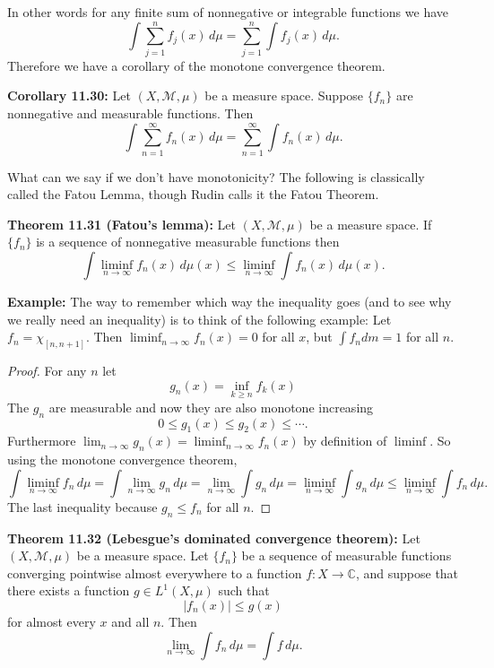 \documentclass[12pt]{book}
\newcommand{\abs}[1]{\left\lvert {#1} \right\rvert}
\newcommand{\C}{{\mathbb{C}}}
\newcommand{\sM}{{\mathcal{M}}}
\theoremstyle{plain}
\theoremstyle{remark}
\theoremstyle{definition}
\theoremstyle{exercise}
\theoremstyle{example}
\begin{document}
In other words for any finite sum of nonnegative or integrable functions we
have
$$
\int \sum_{j=1}^n f_j(x) \, d\mu
=
\sum_{j=1}^n \int f_j(x) \, d\mu .
$$
Therefore we have a corollary of the monotone convergence theorem.

\medskip

\textbf{Corollary 11.30:}
Let $(X,\sM,\mu)$ be a measure space.
Suppose $\{ f_n \}$ are nonnegative and measurable functions.  Then
$$
\int \sum_{n=1}^\infty f_n(x) \, d\mu
=
\sum_{n=1}^\infty \int f_n(x) \, d\mu .
$$

\medskip

What can we say if we don't have monotonicity?  The following is classically
called the Fatou Lemma, though Rudin calls it the Fatou Theorem.

\medskip

\textbf{Theorem 11.31 (Fatou's lemma):}
Let $(X,\sM,\mu)$ be a measure space.
If $\{ f_n \}$ is a sequence of nonnegative measurable functions then
$$
\int \liminf_{n\to\infty} f_n(x) \, d\mu(x) \leq
\liminf_{n\to\infty} \int f_n(x) \, d\mu(x)  .
$$

\medskip

\textbf{Example:}
The way to remember which way the inequality goes (and to see why we really
need an inequality) is to think of the
following example:  Let $f_n = \chi_{[n,n+1]}$.  Then 
$\liminf_{n\to\infty} f_n(x) = 0$ for all $x$, but 
$\int f_n dm = 1$ for all $n$.

\medskip

\begin{proof}
For any $n$ let
$$
g_n(x) = \inf_{k \geq n} f_k(x)
$$
The $g_n$ are measurable and now they are also monotone increasing
$$
0 \leq g_1(x) \leq g_2(x) \leq \cdots .
$$
Furthermore $\lim_{n\to\infty} g_n(x) = \liminf_{n\to\infty} f_n(x)$ by
definition of $\liminf$.  So using the monotone convergence theorem,
$$
\int
\liminf_{n\to\infty} f_n \, d\mu
=
\int
\lim_{n\to\infty} g_n \, d\mu
=
\lim_{n\to\infty} 
\int g_n \, d\mu
=
\liminf_{n\to\infty} 
\int g_n \, d\mu
\leq
\liminf_{n\to\infty} 
\int f_n \, d\mu .
$$
The last inequality because $g_n \leq f_n$ for all $n$.
\end{proof}

\medskip

\textbf{Theorem 11.32 (Lebesgue's dominated convergence theorem):}
Let $(X,\sM,\mu)$ be a measure space.
Let $\{ f_n \}$ be a sequence of measurable functions
converging pointwise almost everywhere to a function $f
\colon X \to \C$, and suppose that there exists a function $g \in L^1(X,\mu)$
such that
$$
\abs{f_n(x)} \leq g(x)
$$
for almost every $x$ and all $n$.  Then
$$
\lim_{n\to\infty} \int f_n \, d\mu = 
\int f \, d\mu .
$$
\end{document}
